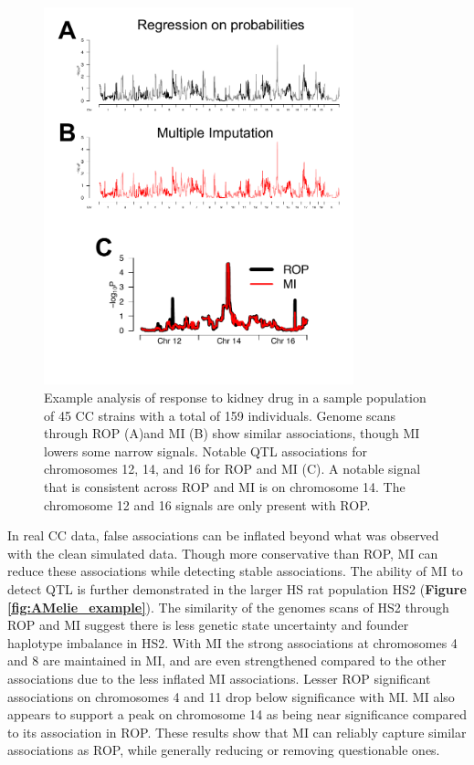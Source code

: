 \begin{figure}
\renewcommand{\familydefault}{\sfdefault}\normalfont
\centering
\includegraphics[width=0.8\textwidth, trim={0in 0.5in 0in 0in}, clip]{figures/4-mi/CC_example.pdf}
\caption[Comparison of ROP and MI in CC data]{Example analysis of response to kidney drug in a sample population of 45 CC strains with a total of 159 individuals. Genome scans through ROP (A)and MI (B) show similar associations, though MI lowers some narrow signals. Notable QTL associations for chromosomes 12, 14, and 16 for ROP and MI (C). A notable signal that is consistent across ROP and MI is on chromosome 14. The chromosome 12 and 16 signals are only present with ROP. \label{fig:CC_example}}
\end{figure}

In real CC data, false associations can be inflated beyond what was observed with the clean simulated data. Though more conservative than ROP, MI can reduce these associations while detecting stable associations. The ability of MI to detect QTL is further demonstrated in the larger HS rat population HS2 (\textbf{Figure \ref{fig:AMelie_example}}). The similarity of the genomes scans of HS2 through ROP and MI suggest there is less genetic state uncertainty and founder haplotype imbalance in HS2. With MI the strong associations at chromosomes 4 and 8 are maintained in MI, and are even strengthened compared to the other associations due to the less inflated MI associations. Lesser ROP significant associations on chromosomes 4 and 11 drop below significance with MI. MI also appears to support a peak on chromosome 14 as being near significance compared to its association in ROP. These results show that MI can reliably capture similar associations as ROP, while generally reducing or removing questionable ones.

